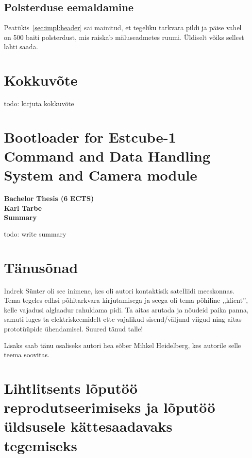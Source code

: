 \documentclass[12pt,a4paper]{article}
\begin{document}
\subsection{Polsterduse eemaldamine}
Peatükis~\ref{sec:impl:header} sai mainitud, et tegeliku tarkvara pildi ja päise
vahel on 500 baiti polsterdust, mis raiskab mäluseadmetes ruumi. Üldiselt võiks
sellest lahti saada.

\section{Kokkuvõte}
todo: kirjuta kokkuvõte
\section*{Bootloader for Estcube-1 Command and Data Handling System and Camera module}
\begin{center}
\bf Bachelor Thesis (6 ECTS)\\
Karl Tarbe\\
Summary
\end{center}
todo: write summary

\section*{Tänusõnad}
Indrek Sünter oli see inimene, kes oli autori kontaktisik satelliidi meeskonnas.
Tema tegeles \gls{cdhs}i põhitarkvara kirjutamisega ja seega oli tema põhiline
,,klient'', kelle vajadusi alglaadur rahuldama pidi. Ta aitas arutada ja nõudeid
paika panna, samuti luges ta elektriskeemidelt ette vajalikud sisend/väljund
viigud ning aitas prototüüpide ühendamisel. Suured tänud talle!

Lisaks saab tänu osaliseks autori hea sõber Mihkel Heidelberg, kes autorile selle
teema soovitas.

\label{viited}



\pagebreak
\section*{Lihtlitsents lõputöö reprodutseerimiseks ja lõputöö üldsusele
kättesaadavaks tegemiseks}
\end{document}
